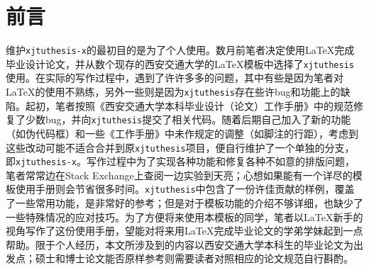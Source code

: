 %
%
%
%
%
%
%

\chapter{前言}

维护\texttt{xjtuthesis-x}的最初目的是为了个人使用。数月前笔者决定使用\LaTeX 完成毕业设计论文，并从数个现存的西安交通大学的\LaTeX 模板中选择了\texttt{xjtuthesis}使用。在实际的写作过程中，遇到了许许多多的问题，其中有些是因为笔者对\LaTeX 的使用不熟练，另外一些则是因为\texttt{xjtuthesis}存在些许bug和功能上的缺陷。起初，笔者按照《西安交通大学本科毕业设计（论文）工作手册》中的规范修复了少数bug，并向\texttt{xjtuthesis}提交了相关代码。随着后期自己加入了新的功能（如伪代码框）和一些《工作手册》中未作规定的调整（如脚注的行距），考虑到这些改动可能不适合合并到原\texttt{xjtuthesis}项目，便自行维护了一个单独的分支，即\texttt{xjtuthesis-x}。写作过程中为了实现各种功能和修复各种不如意的排版问题，笔者常常边在Stack Exchange上查阅一边实验到天亮；心想如果能有一个详尽的模板使用手册则会节省很多时间。\texttt{xjtuthesis}中包含了一份许佳贡献的样例，覆盖了一些常用功能，是非常好的参考；但是对于模板功能的介绍不够详细，也缺少了一些特殊情况的应对技巧。为了方便将来使用本模板的同学，笔者以\LaTeX 新手的视角写作了这份使用手册，望能对将来用\LaTeX 完成毕业论文的学弟学妹起到一点帮助。限于个人经历，本文所涉及到的内容以西安交通大学本科生的毕业论文为出发点；硕士和博士论文能否原样参考则需要读者对照相应的论文规范自行斟酌。

